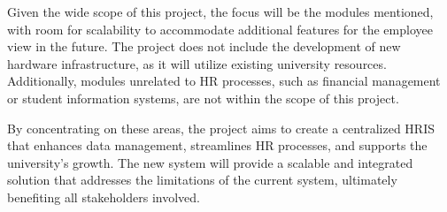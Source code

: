     Given the wide scope of this project, the focus will be the modules mentioned, with room for scalability to accommodate additional features for the employee view in the future. The project does not include the development of new hardware infrastructure, as it will utilize existing university resources. Additionally, modules unrelated to HR processes, such as financial management or student information systems, are not within the scope of this project.
    
    By concentrating on these areas, the project aims to create a centralized HRIS that enhances data management, streamlines HR processes, and supports the university's growth. The new system will provide a scalable and integrated solution that addresses the limitations of the current system, ultimately benefiting all stakeholders involved.


